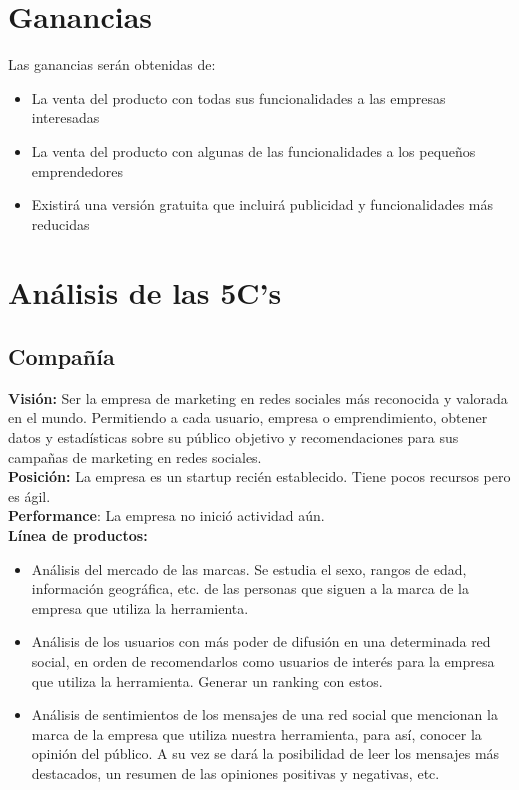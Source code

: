 \documentclass[oneside]{book}
\begin{document}
\section{Ganancias}

Las ganancias ser\'{a}n obtenidas de:
\begin{itemize}
\item La venta del producto con todas sus funcionalidades a las empresas interesadas
\item La venta del producto con algunas de las funcionalidades a los peque\~{n}os emprendedores
\item Existir\'{a} una versión gratuita que incluir\'{a} publicidad y funcionalidades más reducidas
\end{itemize}


\newpage

\section{Análisis de las 5C’s}


\subsection{Compa\~{n}\'{i}a}

	\textbf{Visi\'{o}n:} Ser la empresa de marketing en redes sociales m\'{a}s reconocida y valorada en el mundo. Permitiendo a cada usuario, empresa o emprendimiento, obtener datos y estadísticas sobre su p\'{u}blico objetivo y recomendaciones para sus campa\~{n}as de marketing en redes sociales.\\

	\textbf{Posición:} La empresa es un startup recién establecido. Tiene pocos recursos pero es \'{a}gil.\\

	\textbf{Performance}: La empresa no inici\'{o} actividad a\'{u}n. \\

	\textbf{Línea de productos:}

	\begin{itemize}
		\item An\'{a}lisis del mercado de las marcas. Se estudia el sexo, rangos de edad, información geográfica, etc. de las personas que siguen a la marca de la empresa que utiliza la herramienta. 
		
		\item Análisis de los usuarios con m\'{a}s poder de difusi\'{o}n en una determinada red social, en orden de recomendarlos como usuarios de inter\'{e}s para la empresa que utiliza la herramienta. Generar un ranking con estos.
		
		\item An\'{a}lisis de sentimientos de los mensajes de una red social que mencionan la marca de la empresa que utiliza nuestra herramienta, para as\'{i}, conocer la opini\'{o}n del p\'{u}blico. A su vez se dar\'{a} la posibilidad de leer los mensajes más destacados, un resumen de las opiniones positivas y negativas, etc.
	\end{itemize}
\end{document}
